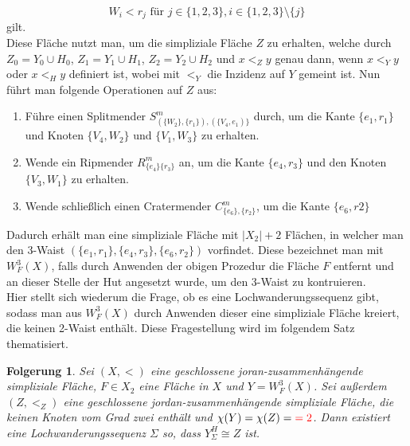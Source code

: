 \documentclass[12pt,titlepage]{article}
\newtheorem{folgerung}{Folgerung}[section]
\begin{document}
\[
W_i < r_j \text{ für } j\in \{1,2,3\},i\in\{1,2,3\}\setminus \{j\}
\] gilt.\\
Diese Fläche nutzt man, um die simpliziale Fläche $Z$ zu erhalten, welche durch $Z_0=Y_0 \cup H_0$, $Z_1=Y_1 \cup H_1$, $Z_2=Y_2 \cup H_2$ und $x<_Z y$ genau dann, wenn $x <_Y y$ oder $x <_H y$ definiert ist, wobei mit $<_Y$ die Inzidenz auf $Y$ gemeint ist. Nun führt man folgende Operationen auf $Z$ aus:
\begin{enumerate}
\item Führe einen Splitmender $S^m_{(\{W_2\},\{r_1\}),(\{V_4,e_1)\}}$ durch, um die Kante $\{e_1,r_1\}$ und Knoten $\{V_4,W_2\}$ und $\{V_1,W_3\}$ zu erhalten.
\item Wende ein Ripmender $R^m_{\{e_4\}\{r_3\}}$ an, um die Kante $\{e_4,r_3\}$ und den Knoten $\{V_3,W_1\}$ zu erhalten. 
\item Wende schließlich einen Cratermender $C^m_{\{e_6\},\{r_2\}}$, um die Kante $\{e_6,r2\}$
\end{enumerate}
Dadurch erhält man eine simpliziale Fläche mit $\vert X_2\vert +2$ Flächen, in welcher man den 3-Waist $(\{e_1,r_1\},\{e_4,r_3\},\{e_6,r_2\})$ vorfindet. Diese bezeichnet man mit \emph{$W_F^3(X)$}, falls durch Anwenden der obigen Prozedur die Fläche $F$ entfernt und an dieser Stelle der Hut angesetzt wurde, um den 3-Waist zu kontruieren.\\
Hier stellt sich wiederum die Frage, ob es eine Lochwanderungssequenz gibt, sodass man aus $W_F^3(X)$ durch Anwenden dieser eine simpliziale Fläche kreiert, die keinen 2-Waist enthält. Diese Fragestellung wird im folgendem Satz thematisiert.
\begin{folgerung}
Sei $(X,<)$ eine geschlossene joran-zusammenhängende simpliziale Fläche, $F\in X_2$ eine Fläche in $X$ und $Y=W^3_F(X)$. Sei außerdem $(Z,<_Z)$ eine geschlossene jordan-zusammenhängende simpliziale Fläche, die keinen Knoten vom Grad zwei enthält und $\chi(Y)=\chi(Z)=\textcolor{red}{=2}$. Dann existiert eine Lochwanderungssequenz $\Sigma$ so, dass $Y_{\Sigma}^H \cong Z$ ist.
\end{folgerung}
\end{document}
